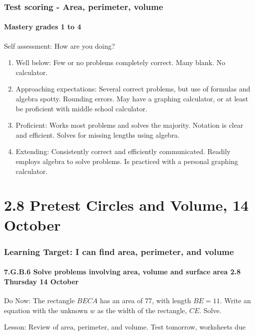 \documentclass{beamer}
\begin{document}
\frame
{
  \frametitle{Test scoring - Area, perimeter, volume}
  \framesubtitle{Mastery grades 1 to 4}

  \begin{block}{Self assessment: How are you doing?}
    
    \begin{enumerate}
    \item Well below: Few or no problems completely correct. Many blank. No calculator.
    \item Approaching expectations: Several correct problems, but use of formulas and algebra spotty. Rounding errors. May have a graphing calculator, or at least be proficient with middle school calculator.
    \item Proficient: Works most problems and solves the majority. Notation is clear and efficient. Solves for missing lengths using algebra.
    \item Extending: Consistently correct and efficiently communicated. Readily employs algebra to solve problems. Is practiced with a personal graphing calculator.
    \end{enumerate}
  \end{block}
}

\section{2.8 Pretest Circles and Volume, 14 October}
\frame
{
  \frametitle{Learning Target: I can find area, perimeter, and volume}
  \framesubtitle{7.G.B.6 Solve problems involving area, volume and surface area \hfill \alert{2.8 Thursday 14 October}}
  \begin{block}{Do Now: The rectangle $BECA$ has an area of 77, with length $BE=11$. Write an equation with the unknown $w$ as the width of the rectangle, $CE$. Solve.}
    \begin{flushright}
    \end{flushright}
\end{block}
  Lesson: Review of area, perimeter, and volume. \alert{Test tomorrow, worksheets due}
} 
\end{document}
